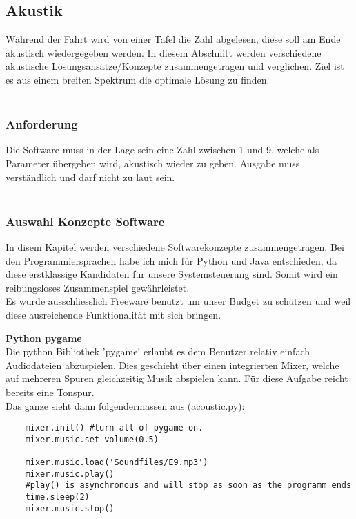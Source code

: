 \documentclass[../../main.tex]{subfiles}
\begin{document}
    \subsection{Akustik}
    Während der Fahrt wird von einer Tafel die Zahl abgelesen, diese soll am Ende akustisch wiedergegeben werden.
    In diesem Abschnitt werden verschiedene akustische Lösungsansätze/Konzepte zusammengetragen und verglichen.
    Ziel ist es aus einem breiten Spektrum die optimale Lösung zu finden.\\
    \\

    \subsubsection{Anforderung}
    Die Software muss in der Lage sein eine Zahl zwischen 1 und 9, welche als Parameter übergeben wird, akustisch wieder zu geben.
    Ausgabe muss verständlich und darf nicht zu laut sein.\\
    \\

    \subsubsection{Auswahl Konzepte Software}
    In disem Kapitel werden verschiedene Softwarekonzepte zusammengetragen. Bei den Programmiersprachen habe ich mich für Python
    und Java entschieden, da diese erstklassige Kandidaten für unsere Systemsteuerung sind.
    Somit wird ein reibungsloses Zusammenspiel gewährleistet.\\

    Es wurde ausschliesslich Freeware benutzt um unser Budget zu schützen und weil diese ausreichende Funktionalität mit sich bringen.

    \textbf{Python pygame}\\
    Die python Bibliothek 'pygame' erlaubt es dem Benutzer relativ einfach Audiodateien abzuspielen.
    Dies geschieht über einen integrierten Mixer, welche auf mehreren Spuren gleichzeitig Musik abspielen kann.
    Für diese Aufgabe reicht bereits eine Tonspur.\\

    Das ganze sieht dann folgendermassen aus (acoustic.py):
    \begin{lstlisting}
    mixer.init() #turn all of pygame on.
    mixer.music.set_volume(0.5)

    mixer.music.load('Soundfiles/E9.mp3')
    mixer.music.play()
    #play() is asynchronous and will stop as soon as the programm ends
    time.sleep(2)
    mixer.music.stop()
    \end{lstlisting}
\end{document}
